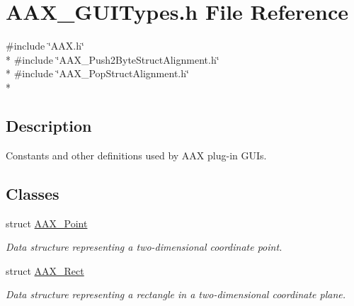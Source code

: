\hypertarget{a00214}{}\section{A\+A\+X\+\_\+\+G\+U\+I\+Types.\+h File Reference}
\label{a00214}
{\ttfamily \#include \char`\"{}A\+A\+X.\+h\char`\"{}}\\*
{\ttfamily \#include \char`\"{}A\+A\+X\+\_\+\+Push2\+Byte\+Struct\+Alignment.\+h\char`\"{}}\\*
{\ttfamily \#include \char`\"{}A\+A\+X\+\_\+\+Pop\+Struct\+Alignment.\+h\char`\"{}}\\*


\subsection{Description}
Constants and other definitions used by A\+A\+X plug-\/in G\+U\+Is. 

\subsection*{Classes}
\begin{DoxyCompactItemize}
\item 
struct \hyperlink{a00119}{A\+A\+X\+\_\+\+Point}
\begin{DoxyCompactList}\small\item\em Data structure representing a two-\/dimensional coordinate point. \end{DoxyCompactList}\item 
struct \hyperlink{a00120}{A\+A\+X\+\_\+\+Rect}
\begin{DoxyCompactList}\small\item\em Data structure representing a rectangle in a two-\/dimensional coordinate plane. \end{DoxyCompactList}\end{DoxyCompactItemize}
